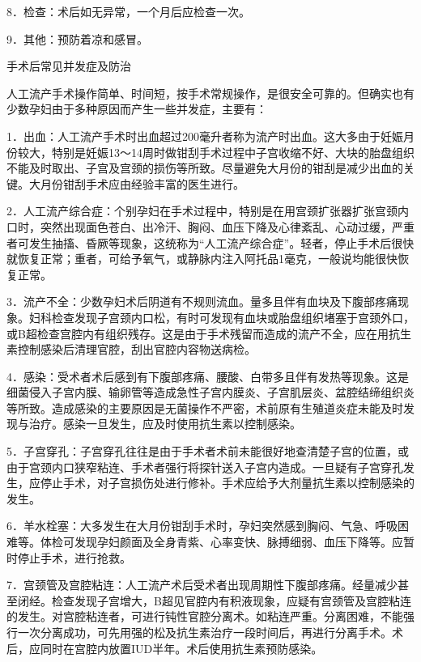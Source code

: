 \documentclass[12pt,UTF8]{ctexbook}
\begin{document}
8．检查：术后如无异常，一个月后应检查一次。

9．其他：预防着凉和感冒。





手术后常见并发症及防治


人工流产手术操作简单、时间短，按手术常规操作，是很安全可靠的。但确实也有少数孕妇由于多种原因而产生一些并发症，主要有：

1．出血：人工流产手术时出血超过200毫升者称为流产时出血。这大多由于妊娠月份较大，特别是妊娠13～14周时做钳刮手术过程中子宫收缩不好、大块的胎盘组织不能及时取出、子宫及宫颈的损伤等所致。尽量避免大月份的钳刮是减少出血的关键。大月份钳刮手术应由经验丰富的医生进行。

2．人工流产综合症：个别孕妇在手术过程中，特别是在用宫颈扩张器扩张宫颈内口时，突然出现面色苍白、出冷汗、胸闷、血压下降及心律紊乱、心动过缓，严重者可发生抽搐、昏厥等现象，这统称为“人工流产综合症”。轻者，停止手术后很快就恢复正常；重者，可给予氧气，或静脉内注入阿托品1毫克，一般说均能很快恢复正常。

3．流产不全：少数孕妇术后阴道有不规则流血。量多且伴有血块及下腹部疼痛现象。妇科检查发现子宫颈内口松，有时可发现有血块或胎盘组织堵塞于宫颈外口，或B超检查宫腔内有组织残存。这是由于手术残留而造成的流产不全，应在用抗生素控制感染后清理官腔，刮出官腔内容物送病检。

4．感染：受术者术后感到有下腹部疼痛、腰酸、白带多且伴有发热等现象。这是细菌侵入子宫内膜、输卵管等造成急性子宫内膜炎、子宫肌层炎、盆腔结缔组织炎等所致。造成感染的主要原因是无菌操作不严密，术前原有生殖道炎症未能及时发现与治疗。感染一旦发生，应及时使用抗生素以控制感染。

5．子宫穿孔：子宫穿孔往往是由于手术者术前未能很好地查清楚子宫的位置，或由于宫颈内口狭窄粘连、手术者强行将探针送入子宫内造成。一旦疑有子宫穿孔发生，应停止手术，对子宫损伤处进行修补。手术应给予大剂量抗生素以控制感染的发生。

6．羊水栓塞：大多发生在大月份钳刮手术时，孕妇突然感到胸闷、气急、呼吸困难等。体检可发现孕妇颜面及全身青紫、心率变快、脉搏细弱、血压下降等。应暂时停止手术，进行抢救。

7．宫颈管及宫腔粘连：人工流产术后受术者出现周期性下腹部疼痛。经量减少甚至闭经。检查发现子宫增大，B超见官腔内有积液现象，应疑有宫颈管及宫腔粘连的发生。对宫腔粘连者，可进行钝性官腔分离术。如粘连严重。分离困难，不能强行一次分离成功，可先用强的松及抗生素治疗一段时间后，再进行分离手术。术后，应同时在宫腔内放置IUD半年。术后使用抗生素预防感染。
\end{document}
